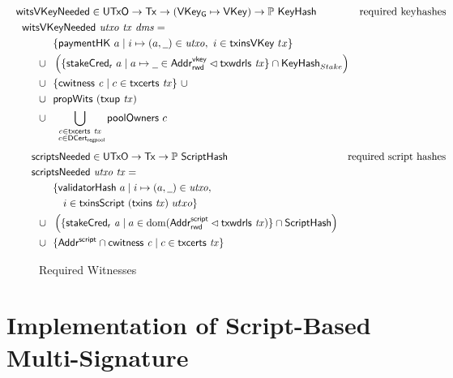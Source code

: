\documentclass[11pt,a4paper,dvipsnames]{article}
\newcommand{\Tx}{\type{Tx}}
\newcommand{\UTxO}{\type{UTxO}}
\newcommand{\DCertRegPool}{\type{DCert_{regpool}}}
\newcommand{\AddrRWDVKey}{\type{Addr_{rwd}^{vkey}}}
\newcommand{\AddrRWDScr}{\type{Addr_{rwd}^{script}}}
\newcommand{\AddrScr}{\type{Addr^{script}}}
\newcommand{\HashScr}{\type{ScriptHash}}
\newcommand{\VKey}{\type{VKey}}
\newcommand{\VKeyGen}{\type{VKey_G}}
\newcommand{\KeyHash}{\type{KeyHash}}
\newcommand{\txcerts}[1]{\fun{txcerts}~ \var{#1}}
\newcommand{\cwitness}[1]{\fun{cwitness}~ \var{#1}}
\newcommand{\txwdrls}[1]{\fun{txwdrls}~ \var{#1}}
\newcommand{\wcard}[0]{\underline{\phantom{a}}}
\theoremstyle{definition}
\begin{document}
\begin{figure}[htb]
  \begin{align*}
    & \hspace{-1cm}\fun{witsVKeyNeeded} \in \UTxO \to \Tx \to (\VKeyGen\mapsto\VKey) \to
      \powerset{\KeyHash}
    & \text{required keyhashes} \\
    &  \hspace{-0.8cm}\fun{witsVKeyNeeded}~\var{utxo}~\var{tx}~\var{dms} = \\
    & ~~\{ \fun{paymentHK}~a \mid i \mapsto (a, \wcard) \in \var{utxo},~i\in\fun{txinsVKey}~{tx} \} \\
    \cup & ~~
           \left(\{\fun{stakeCred_r}~a\mid a\mapsto \wcard \in \AddrRWDVKey
      \restrictdom \txwdrls{tx}\} \cap \KeyHash_{Stake}  \right)\\
    \cup & ~~\{\cwitness{c} \mid c \in \txcerts{tx}\}~\cup \\
    \cup & ~~\fun{propWits}~(\fun{txup}~\var{tx}) \\
    \cup & ~~\bigcup_{\substack{c \in \txcerts{tx} \\ ~c \in\DCertRegPool}} \fun{poolOwners}~{c}
  \end{align*}
  \begin{align*}
    & \hspace{-0.5cm}\fun{scriptsNeeded} \in \UTxO \to \Tx \to
      \powerset{\HashScr}
    & \text{required script hashes} \\
    &  \hspace{-0.5cm}\fun{scriptsNeeded}~\var{utxo}~\var{tx} = \\
    & ~~\{ \fun{validatorHash}~a \mid i \mapsto (a, \wcard) \in \var{utxo},\\
    & ~~~~~i\in\fun{txinsScript}~{(\fun{txins~\var{tx}})}~{utxo}\} \\
    \cup & ~~\left(\{ \fun{stakeCred_{r}}~\var{a} \mid a \in \dom (\AddrRWDScr
           \restrictdom \fun{txwdrls}~\var{tx}) \} \cap \HashScr\right) \\
    \cup & ~~\{\AddrScr \cap \fun{cwitness}~\var{c} \mid c \in \fun{txcerts}~\var{tx}\}
  \end{align*}
  \caption{Required Witnesses}
  \label{fig:functions-witnesses}
\end{figure}

\section{Implementation of Script-Based Multi-Signature}
\label{sec:altern-impl}
\end{document}
